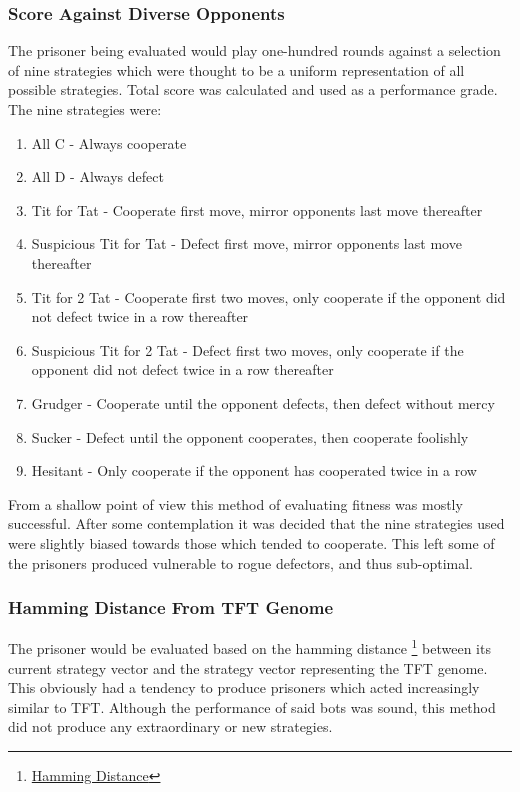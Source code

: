 \documentclass[12pt]{article}
\begin{document}
\subsubsection{Score Against Diverse Opponents}
The prisoner being evaluated would play one-hundred rounds against a selection of nine
strategies which were thought to be a uniform representation of all possible
strategies.  Total score was calculated and used as a performance grade.
The nine strategies were:
\begin{enumerate}
    \item All C - Always cooperate
    \item All D - Always defect
    \item Tit for Tat - Cooperate first move, mirror opponents last move thereafter
    \item Suspicious Tit for Tat - Defect first move, mirror opponents last move
        thereafter
    \item Tit for 2 Tat - Cooperate first two moves, only cooperate if the
        opponent did not defect twice in a row thereafter
    \item Suspicious Tit for 2 Tat - Defect first two moves, only cooperate if the
        opponent did not defect twice in a row thereafter
    \item Grudger - Cooperate until the opponent defects, then defect without mercy
    \item Sucker - Defect until the opponent cooperates, then cooperate foolishly
    \item Hesitant - Only cooperate if the opponent has cooperated twice in a row
\end{enumerate}

From a shallow point of view this method of evaluating fitness was mostly
successful.  After some contemplation it was decided that the
nine strategies used were slightly biased towards those which tended to cooperate.
This left some of the prisoners produced vulnerable to rogue defectors,
and thus sub-optimal.

\subsubsection{Hamming Distance From TFT Genome}
The prisoner would be evaluated based on the hamming distance
\footnote
{\href{https://en.wikipedia.org/wiki/Hamming distance}{Hamming Distance}}
between its current strategy vector and the strategy vector representing
the TFT genome.  This obviously had a tendency to produce prisoners which
acted increasingly similar to TFT.  Although the performance of said bots
was sound, this method did not produce any extraordinary or new strategies.
\end{document}
